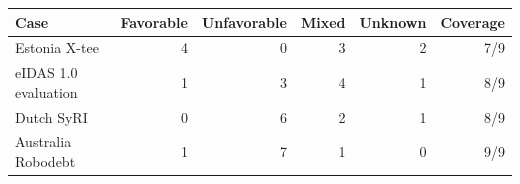 \begin{tabular}{@{}lrrrrr@{}}
\toprule
Case & Favorable & Unfavorable & Mixed & Unknown & Coverage \\
\midrule
Estonia X-tee & 4 & 0 & 3 & 2 & 7/9 \\
eIDAS 1.0 evaluation & 1 & 3 & 4 & 1 & 8/9 \\
Dutch SyRI & 0 & 6 & 2 & 1 & 8/9 \\
Australia Robodebt & 1 & 7 & 1 & 0 & 9/9 \\
\bottomrule
\end{tabular}
